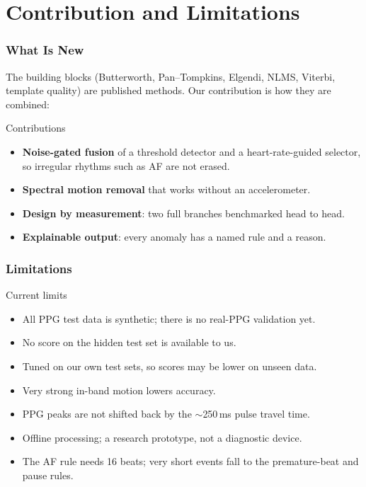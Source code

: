 \documentclass[t,aspectratio=169]{beamer}
\begin{document}
\section{Contribution and Limitations}
\begin{frame}
\frametitle{What Is New}
\small The building blocks (Butterworth, Pan--Tompkins, Elgendi, NLMS, Viterbi, template quality) are published
methods. Our contribution is how they are combined:
\vspace{2mm}
\begin{exampleblock}{Contributions}
\begin{itemize}
  \item \textbf{Noise-gated fusion} of a threshold detector and a heart-rate-guided selector, so irregular rhythms
        such as AF are not erased.
  \item \textbf{Spectral motion removal} that works without an accelerometer.
  \item \textbf{Design by measurement}: two full branches benchmarked head to head.
  \item \textbf{Explainable output}: every anomaly has a named rule and a reason.
\end{itemize}
\end{exampleblock}
\end{frame}

\begin{frame}
\frametitle{Limitations}
\begin{alertblock}{Current limits}
\begin{itemize}
  \item All PPG test data is synthetic; there is no real-PPG validation yet.
  \item No score on the hidden test set is available to us.
  \item Tuned on our own test sets, so scores may be lower on unseen data.
  \item Very strong in-band motion lowers accuracy.
  \item PPG peaks are not shifted back by the $\sim$250\,ms pulse travel time.
  \item Offline processing; a research prototype, not a diagnostic device.
  \item The AF rule needs 16 beats; very short events fall to the premature-beat and pause rules.
\end{itemize}
\end{alertblock}
\end{frame}
\end{document}
